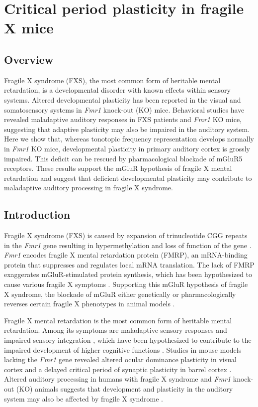 \chapter{Critical period plasticity in fragile X mice}

\section{Overview}
\newrefsection

Fragile X syndrome (FXS), the most common form of heritable mental retardation, is a developmental disorder with known effects within sensory systems. Altered developmental plasticity has been reported in the visual and somatosensory systems in \textit{Fmr1} knock-out (KO) mice. Behavioral studies have revealed maladaptive auditory responses in FXS patients and \textit{Fmr1} KO mice, suggesting that adaptive plasticity may also be impaired in the auditory system. Here we show that, whereas tonotopic frequency representation develops normally in \textit{Fmr1} KO mice, developmental plasticity in primary auditory cortex is grossly impaired. This deficit can be rescued by pharmacological blockade of mGluR5 receptors. These results support the mGluR hypothesis of fragile X mental retardation and suggest that deficient developmental plasticity may contribute to maladaptive auditory processing in fragile X syndrome.

\section{Introduction}

Fragile X syndrome (FXS) is caused by expansion of trinucleotide CGG repeats in the \textit{Fmr1} gene resulting in hypermethylation and loss of function of the gene \cite{Jin2003}. \textit{Fmr1} encodes fragile X mental retardation protein (FMRP), an mRNA-binding protein that suppresses and regulates local mRNA translation. The lack of FMRP exaggerates mGluR-stimulated protein synthesis, which has been hypothesized to cause various fragile X symptoms \cite{Bear2004, Osterweil2010}. Supporting this mGluR hypothesis of fragile X syndrome, the blockade of mGluR either genetically or pharmacologically reverses certain fragile X phenotypes in animal models \cite{McBride2005, Yan2005, Dolen2007, DeVrij2008, Meredith2011, Su2011, Michalon2012, Thomas2012}.

Fragile X mental retardation is the most common form of heritable mental retardation. Among its symptoms are maladaptive sensory responses and impaired sensory integration \cite{Miller1999, Chen2001, Nielsen2002}, which have been hypothesized to contribute to the impaired development of higher cognitive functions \cite{Hanson, Leblanc2011}. Studies in mouse models lacking the \textit{Fmr1} gene revealed altered ocular dominance plasticity in visual cortex and a delayed critical period of synaptic plasticity in barrel cortex \cite{Dolen2007, Harlow2010a}. Altered auditory processing in humans with fragile X syndrome and \textit{Fmr1} knock-out (KO) animals suggests that development and plasticity in the auditory system may also be affected by fragile X syndrome \cite{Miller1999, Chen2001, Nielsen2002}.

